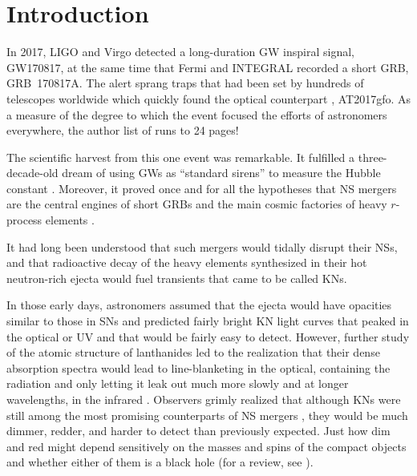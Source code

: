 \documentclass[twocolumn,times]{aastex631}
\begin{document}

\acresetall

\section{Introduction} \label{sec:intro}

In 2017, \ac{LIGO} and Virgo \citep{2017PhRvL.119p1101A} detected a long-duration \ac{GW} inspiral signal, GW170817, at the same time that Fermi \citep{2017ApJ...848L..14G} and INTEGRAL \citep{2017ApJ...848L..15S} recorded a short \ac{GRB}, GRB~170817A. The alert sprang traps that had been set by hundreds of telescopes worldwide \citep{2014ApJS..211....7A,2016ApJ...826L..13A} which quickly found the optical counterpart \citep{2017Sci...358.1556C}, AT2017gfo. As a measure of the degree to which the event focused the efforts of astronomers everywhere, the author list of \citet{2017ApJ...848L..12A} runs to 24 pages!

The scientific harvest from this one event was remarkable. It fulfilled a three-decade-old dream of using \acp{GW} as ``standard sirens'' to measure the Hubble constant \citep{1986Natur.323..310S,2017Natur.551...85A}. Moreover, it proved once and for all the hypotheses that \ac{NS} mergers are the central engines of short \acp{GRB} \citep{2013ApJ...776...18F,2017ApJ...848L..13A} and the main cosmic factories of heavy $r$-process elements \citep{1999ApJ...525L.121F,2017Sci...358.1583K,2017Sci...358.1570D,2017Natur.551...80K}.

It had long been understood that such mergers would tidally disrupt their \acp{NS}, and that radioactive decay of the heavy elements synthesized in their hot neutron-rich ejecta would fuel transients \citep{1974ApJ...192L.145L,1989Natur.340..126E,1998ApJ...507L..59L} that came to be called \acp{KN}.

In those early days, astronomers assumed that the ejecta would have opacities similar to those in \acp{SN} and predicted fairly bright \ac{KN} light curves that peaked in the optical or \ac{UV} and that would be fairly easy to detect. However, further study of the atomic structure of lanthanides led to the realization that their dense absorption spectra would lead to line-blanketing in the optical, containing the radiation and only letting it leak out much more slowly and at longer wavelengths, in the infrared \citep{2013ApJ...774...25K}. Observers grimly realized that although \acp{KN} were still among the most promising counterparts of \ac{NS} mergers \citep{2012ApJ...746...48M}, they would be much dimmer, redder, and harder to detect than previously expected. Just how dim and red might depend sensitively on the masses and spins of the compact objects and whether either of them is a black hole (for a review, see \citealt{2020LRR....23....1M}).
\end{document}
